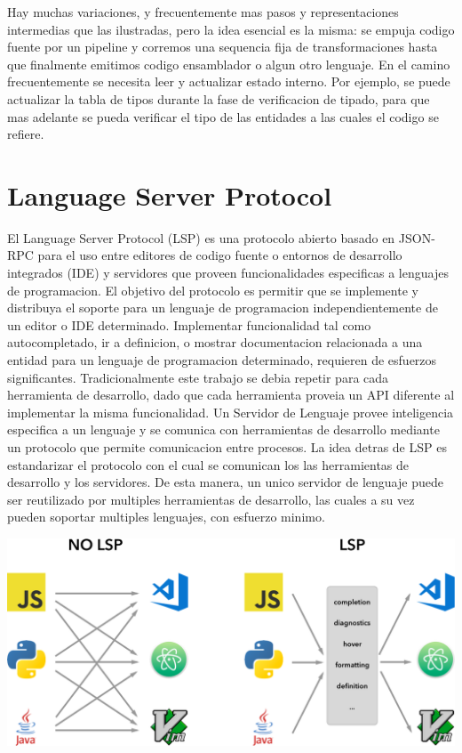 \documentclass[12pt, a4paper]{report}
\begin{document}
Hay muchas variaciones, y frecuentemente mas pasos y representaciones intermedias que las ilustradas, pero la idea esencial es la misma: se empuja codigo fuente por un pipeline y corremos una sequencia fija de transformaciones hasta que finalmente emitimos codigo ensamblador o algun otro lenguaje.
En el camino frecuentemente se necesita leer y actualizar estado interno.
Por ejemplo, se puede actualizar la tabla de tipos durante la fase de verificacion de tipado, para que mas adelante se pueda verificar el tipo de las entidades a las cuales el codigo se refiere.
\cite{olle_query_based}

\section*{Language Server Protocol}

El Language Server Protocol (LSP) es una protocolo abierto basado en JSON-RPC para el uso entre editores de codigo fuente o entornos de desarrollo integrados (IDE) y servidores que proveen funcionalidades especificas a lenguajes de programacion.
El objetivo del protocolo es permitir que se implemente y distribuya el soporte para un lenguaje de programacion independientemente de un editor o IDE determinado.
Implementar funcionalidad tal como autocompletado, ir a definicion, o mostrar documentacion relacionada a una entidad para un lenguaje de programacion determinado, requieren de esfuerzos significantes.
Tradicionalmente este trabajo se debia repetir para cada herramienta de desarrollo, dado que cada herramienta proveia un API diferente al implementar la misma funcionalidad.
Un Servidor de Lenguaje provee inteligencia especifica a un lenguaje y se comunica con herramientas de desarrollo mediante un protocolo que permite comunicacion entre procesos.
La idea detras de LSP es estandarizar el protocolo con el cual se comunican los las herramientas de desarrollo y los servidores. De esta manera, un unico servidor de lenguaje puede ser reutilizado por multiples herramientas de desarrollo, las cuales a su vez pueden soportar multiples lenguajes, con esfuerzo minimo.
\cite{language_server_protocol}

\includegraphics{lsp}
\end{document}
